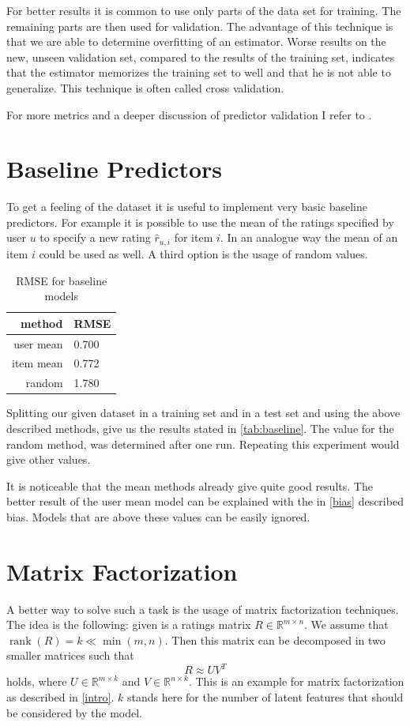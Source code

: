 \documentclass[DIV=14,twocolumn]{scrartcl}
\DeclareMathOperator{\rank}{rank}
\begin{document}
For better results it is common to use only parts of the data set for training. The remaining parts are then used for validation. The advantage of this technique is that we are able to determine overfitting of an estimator. Worse results on the new, unseen validation set, compared to the results of the training set, indicates that the estimator memorizes the training set to well and that he is not able to generalize. This technique is often called cross validation. 

For more metrics and a deeper discussion of predictor validation I refer to \cite{Ag16}.

\section{Baseline Predictors}\label{baseline}
To get a feeling of the dataset it is useful to implement very basic baseline predictors. For example it is possible to use the mean of the ratings specified by user $u$ to specify a new rating $\hat{r}_{u,i}$ for item $i$. In an analogue way the mean of an item $i$ could be used as well. A third option is the usage of random values. 

\begin{table}[h]
	\centering
	\begin{tabular}{r|l}
		method & RMSE \\ \hline
		user mean & 0.700 \\
		item mean & 0.772 \\
		random & 1.780
	\end{tabular}
	\caption{RMSE for baseline models}
	\label{tab:baseline}
\end{table}

Splitting our given dataset in a training set and in a test set and using the above described methods, give us the results stated in \autoref{tab:baseline}. The value for the random method, was determined after one run. Repeating this experiment would give other values.

It is noticeable that the mean methods already give quite good results. The better result of the user mean model can be explained with the in \autoref{bias} described bias. Models that are above these values can be easily ignored. 


\section{Matrix Factorization}\label{matrixfactorization}
A better way to solve such a task is the usage of matrix factorization techniques. The idea is the following: given is a ratings matrix $R\in\mathbb{R}^{m\times n}$. We assume that $\rank(R)=k\ll\min(m,n)$. Then this matrix can be decomposed in two smaller matrices such that 
$$R\approx UV^T$$ holds, where $U\in\mathbb{R}^{m\times k}$ and $V\in\mathbb{R}^{n\times k}$. This is an example for matrix factorization as described in \autoref{intro}. $k$ stands here for the number of latent features that should be considered by the model. 
\end{document}
